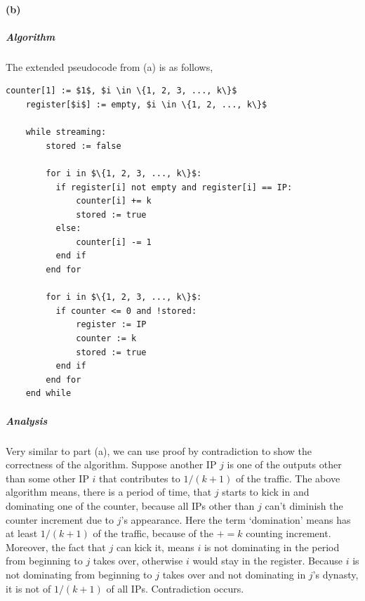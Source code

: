 \documentclass[12pt]{article}
\begin{document}
\paragraph{(b)} \subparagraph{Algorithm} The extended pseudocode from (a) is as follows,

\begin{lstlisting}[style=customc]
	counter[1] := $1$, $i \in \{1, 2, 3, ..., k\}$
	register[$i$] := empty, $i \in \{1, 2, ..., k\}$
	
	while streaming:
	    stored := false
	    
	    for i in $\{1, 2, 3, ..., k\}$:
  	      if register[i] not empty and register[i] == IP:
	          counter[i] += k
	          stored := true
	      else:
	          counter[i] -= 1
	      end if
	    end for
	    
	    for i in $\{1, 2, 3, ..., k\}$:
	      if counter <= 0 and !stored:
	          register := IP
	          counter := k	
	          stored := true	
	      end if
	    end for
	end while
\end{lstlisting}

\subparagraph{Analysis} Very similar to part (a), we can use proof by contradiction to show the correctness of the algorithm. Suppose another IP $j$ is one of the outputs other than some other IP $i$ that contributes to $1/(k+1)$ of the traffic. The above algorithm means, there is a period of time, that $j$ starts to kick in and dominating one of the counter, because all IPs other than $j$ can't diminish the counter increment due to $j$'s appearance. Here the term `domination' means has at least $1/(k+1)$ of the traffic, because of the $+= k$ counting increment. Moreover, the fact that $j$ can kick it, means $i$ is not dominating in the period from beginning to $j$ takes over, otherwise $i$ would stay in the register. Because $i$ is not dominating from beginning to $j$ takes over and not dominating in $j$'s dynasty, it is not of $1/(k+1)$ of all IPs. Contradiction occurs. 
\end{document}

